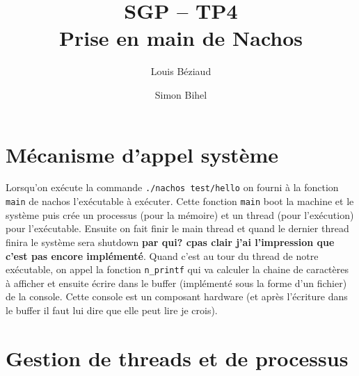 \documentclass{article}
\title{SGP -- TP4\\Prise en main de Nachos}
\author{Louis Béziaud \and Simon Bihel}
\begin{document}
\maketitle

\section{Mécanisme d'appel système}
Lorsqu'on exécute la commande {\tt ./nachos test/hello} on fourni à la fonction {\tt main} de nachos l'exécutable à exécuter. Cette fonction {\tt main} boot la machine et le système puis crée un processus (pour la mémoire) et un thread (pour l'exécution) pour l'exécutable. Ensuite on fait finir le main thread et quand le dernier thread finira le système sera shutdown {\bf par qui? cpas clair j'ai l'impression que c'est pas encore implémenté}. Quand c'est au tour du thread de notre exécutable, on appel la fonction {\tt n\_printf} qui va calculer la chaine de caractères à afficher et ensuite écrire dans le buffer (implémenté sous la forme d'un fichier) de la console. Cette console est un composant hardware (et après l'écriture dans le buffer il faut lui dire que elle peut lire je crois).

\section{Gestion de threads et de processus}
\end{document}

